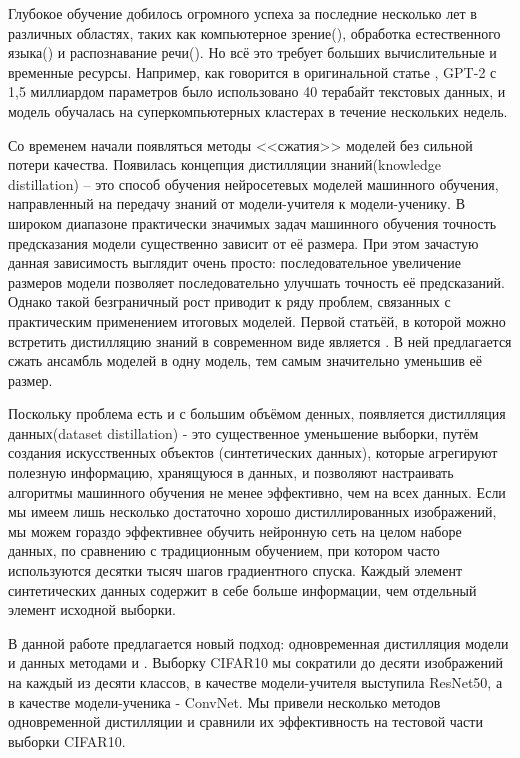 \documentclass[12pt]{article}
\begin{document}
Глубокое обучение добилось огромного успеха за последние несколько лет в различных областях, таких как компьютерное зрение(\cite{guo2022attention}), обработка естественного языка(\cite{raina2022natural}) и распознавание речи(\cite{subramanian2022deep}). Но всё это требует больших вычислительные и временные ресурсы. Например, как говорится в оригинальной статье \cite{radford2019language}, GPT-2 с 1,5 миллиардом параметров было использовано 40 терабайт текстовых данных, и модель обучалась на суперкомпьютерных кластерах в течение нескольких недель.

Со временем начали появляться методы <<сжатия>> моделей без сильной потери качества. Появилась концепция дистилляции знаний(knowledge distillation) – это способ обучения нейросетевых моделей машинного обучения, направленный на передачу знаний от модели-учителя к модели-ученику. В широком диапазоне практически значимых задач машинного обучения точность предсказания модели существенно зависит от её размера. При этом зачастую данная зависимость выглядит очень просто: последовательное увеличение размеров модели позволяет последовательно улучшать точность её предсказаний. Однако такой безграничный рост приводит к ряду проблем, связанных с практическим применением итоговых моделей. Первой статьёй, в которой можно встретить дистилляцию знаний в современном виде является \cite{hinton2015distilling}. В ней предлагается сжать ансамбль моделей в одну модель, тем самым значительно уменьшив её размер.

Поскольку проблема есть и с большим объёмом денных, появляется дистилляция данных(dataset distillation) - это существенное уменьшение выборки, путём создания искусственных объектов (синтетических данных), которые агрегируют полезную информацию, хранящуюся в данных, и позволяют настраивать алгоритмы машинного обучения не менее эффективно, чем на всех данных. Если мы имеем лишь несколько достаточно хорошо дистиллированных изображений, мы можем гораздо эффективнее обучить нейронную сеть на целом наборе данных, по сравнению с традиционным обучением, при котором часто используются десятки тысяч шагов градиентного спуска. Каждый элемент синтетических данных содержит в себе больше информации, чем отдельный элемент исходной выборки. 

В данной работе предлагается новый подход: одновременная дистилляция модели и данных методами \cite{hinton2015distilling} и \cite{cazenavette2022dataset}. Выборку CIFAR10 мы сократили до десяти изображений на каждый из десяти классов, в качестве модели-учителя выступила ResNet50, а в качестве модели-ученика - ConvNet. Мы привели несколько методов одновременной дистилляции и сравнили их эффективность на тестовой части выборки CIFAR10. 
\end{document}
